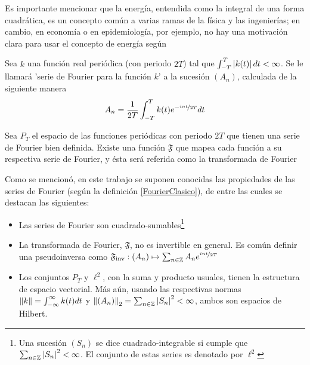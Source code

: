 Es importante mencionar que la energ\'ia, entendida como la integral de una forma cuadr\'atica, es 
un concepto com\'un a varias ramas de la f\'isica y las ingenier\'ias; en cambio, en econom\'ia o 
en epidemiolog\'ia, por ejemplo, no hay una motivaci\'on clara para usar el concepto de energ\'ia 
seg\'un %

\begin{definicion}
Sea $k$ una funci\'on real peri\'odica (con periodo $2T$) tal que 
$\int_{- T }^{ T } \left| k(t) \right| dt < \infty$. 
Se le llamar\'a 'serie de Fourier para la funci\'on $k$' a la sucesi\'on $\left( A_n \right)$, 
calculada de la siguiente manera
\begin{equation*}
A_n = \frac{1}{2 T} \int_{- T }^{ T } k(t) e^{-\nicefrac{ i n t}{2T}} dt
\end{equation*}
\label{FourierClasico}
\end{definicion}

\begin{definicion}
Sea $P_T$ el espacio de las funciones peri\'odicas con periodo $2T$ que tienen una serie de Fourier 
bien definida. Existe una funci\'on $\mathfrak{F}$ que mapea cada funci\'on a su respectiva serie 
de Fourier, y \'esta ser\'a referida como la transformada de Fourier
\label{trFourier}
\end{definicion}

Como se mencion\'o, en este trabajo se suponen conocidas las propiedades de las series de Fourier 
(seg\'un la definici\'on \ref{FourierClasico}), de entre las cuales se destacan las siguientes:
\begin{itemize}
\item Las series de Fourier  son cuadrado-sumables\footnote{Una sucesi\'on $\left( S_n \right)$ se 
dice cuadrado-integrable si cumple que $\sum_{n\in \mathbb{Z}} \left| S_n \right|^{2} < \infty$. El 
conjunto de estas series es denotado por $\ell^{2}$}

\item La transformada de Fourier, $\mathfrak{F}$, no es invertible en general. Es com\'un definir
una pseudoinversa como 
$\mathfrak{F}_{\text{inv}} 
: \left( A_n \right) \mapsto \sum_{n \in \mathbb{Z}} A_n e^{\nicefrac{i n t}{2 T}} $

\item Los conjuntos $P_T$ y $\ell^{2}$, con la suma y producto usuales, tienen la estructura de 
espacio vectorial. M\'as a\'un, usando las respectivas normas $\Vert k \Vert = \int_{-\infty}^{\infty} k(t) dt$ y 
$\left\Vert \left( A_n \right) \right\Vert_2 = \sum_{n\in \mathbb{Z}} \left| S_n \right|^{2} < \infty$,
ambos son espacios de Hilbert.
\end{itemize}


